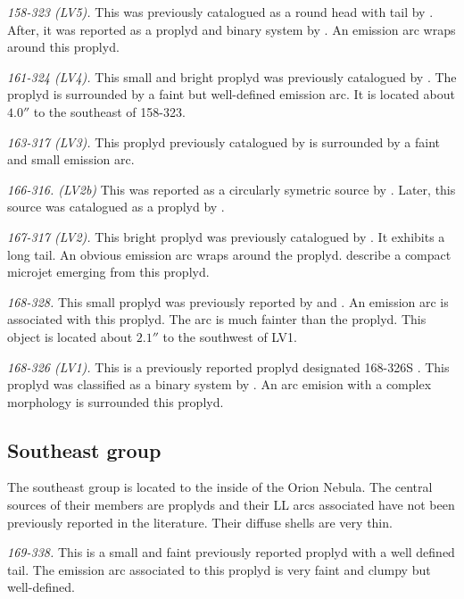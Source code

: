 \documentclass[apj, twocolumn]{aastex63}
\renewcommand\clearpage{}
\begin{document}
\textit{158-323 (LV5).} This was previously catalogued as a round
head with tail by \citet{ODell:1996a}. After, it was reported
as a proplyd and binary system by \citep{Ricci:2008a}. An emission
arc wraps around this proplyd. 
 
\textit{161-324 (LV4).} This small and bright proplyd was
previously catalogued by \citet{ODell:1996a, Ricci:2008a}. The
proplyd is surrounded by a faint but well-defined emission arc.
It is located about \(4.0''\) to the southeast of 158-323.

\textit{163-317 (LV3).} This proplyd previously catalogued by
\citet{ODell:1996a, Ricci:2008a} is surrounded by a faint and
small emission arc. 

\textit{166-316. (LV2b)} This was reported as a circularly symetric
source by \citet{ODell:1996a}. Later, this source was catalogued as
a proplyd by \citet{Ricci:2008a}. 

\textit{167-317 (LV2).} This bright proplyd was previously catalogued
by \citet{ODell:1994a, Ricci:2008a}. It exhibits a long tail. An
obvious emission arc \citep{Bally:2000a} wraps around the proplyd.
\citet{Bally:2000a} describe a compact microjet emerging from this
proplyd. 

\textit{168-328.} This small proplyd was previously reported
by \citet{ODell:1994a} and \citet{Ricci:2008a}. An emission arc is
associated with this proplyd. The arc is much fainter than the
proplyd. This object is located about \(2.1''\) to the southwest
of LV1.  

\textit{168-326 (LV1).} This is a previously reported proplyd
designated 168-326S \citep{ODell:1994a}. This proplyd was classified
as a binary system by \citet{Ricci:2008a}. An arc emision with a
complex morphology is surrounded this proplyd.


\clearpage
\subsection{Southeast group}
\label{sec:se-group}



The southeast group is located to the inside of the Orion Nebula.
The central sources of their members are proplyds and their LL arcs
associated have not been previously reported in the literature.
Their diffuse shells are very thin. 

\textit{169-338.} This is a small and faint previously reported
proplyd \citep{ODell:1994a, Ricci:2008a} with a well defined tail.
The emission arc associated to this proplyd is very faint and clumpy
but well-defined. 
\end{document}

